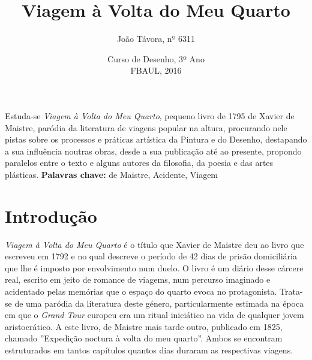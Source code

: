 \documentclass[12pt]{article}
\title{\large{Viagem à Volta do Meu Quarto}}
\author{\vspace*{-3ex}João Távora, nº 6311}
\date{\vspace*{-3ex}Curso de Desenho, 3º Ano\\\vspace*{-1ex}FBAUL, 2016}
\begin{document}

\maketitle

\renewcommand\contentsname{Sumário}
\tableofcontents

\begin{spacing}{1.0}
\begin{small}
  \section{\fontsize{11}{13}\selectfont{Resumo}}

    \noindent Estuda-se \emph{Viagem à Volta do Meu Quarto}, pequeno
    livro de 1795 de Xavier de Maistre, paródia da literatura de
    viagens popular na altura, procurando nele pistas sobre os
    processos e práticas artística da Pintura e do Desenho, destapando
    a sua influência noutras obras, desde a sua publicação até ao
    presente, propondo paralelos entre o texto e alguns autores da
    filosofia, da poesia e das artes plásticas.
    \noindent\textbf{Palavras chave:} de Maistre, Acidente, Viagem
    
\end{small}

\end{spacing}
\vspace*{-1ex}

\section{Introdução}

\emph{Viagem à Volta do Meu Quarto} é o título que Xavier de Maistre
deu ao livro que escreveu em 1792 e no qual descreve o período de 42
dias de prisão domiciliária que lhe é imposto por envolvimento num
duelo. O livro é um diário desse cárcere real, escrito em jeito de
romance de viagems, num percurso imaginado e acidentado pelas memórias
que o espaço do quarto evoca no protagonista. Trata-se de uma paródia
da literatura deste género, particularmente estimada na época em que o
\emph{Grand Tour} europeu era um ritual iniciático na vida de qualquer
jovem aristocrático. A este livro, de Maistre mais tarde outro,
publicado em 1825, chamado ''Expedição noctura à volta do meu
quarto''. Ambos se encontram estruturados em tantos capítulos quantos
dias duraram as respectivas viagens.
\end{document}
